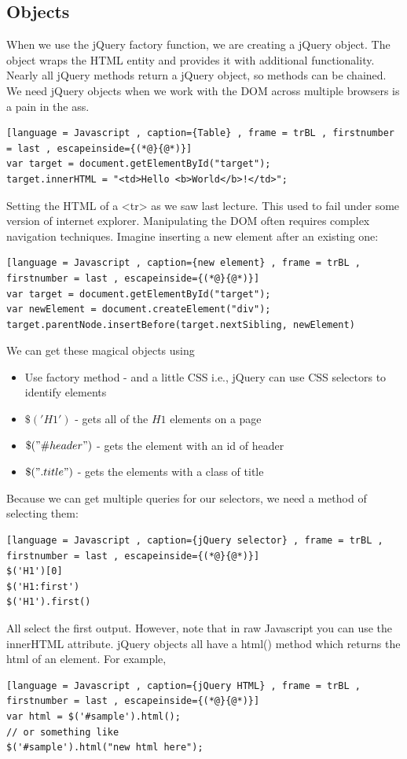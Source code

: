 \documentclass[a4paper]{article}
\theoremstyle{plain}
\theoremstyle{definition}
\theoremstyle{remark}
\begin{document}
\begin{flushleft}
\subsection{Objects}
When we use the jQuery factory function, we are creating a jQuery object. The object wraps the HTML entity and provides it with additional functionality. Nearly all jQuery methods return a jQuery object, so methods can be chained. We need jQuery objects when we work with the DOM across multiple browsers is a pain in the ass.
\begin{lstlisting}[language = Javascript , caption={Table} , frame = trBL , firstnumber = last , escapeinside={(*@}{@*)}]
var target = document.getElementById("target");
target.innerHTML = "<td>Hello <b>World</b>!</td>";
\end{lstlisting}
Setting the HTML of a <tr> as we saw last lecture. This used to fail under some version of internet explorer. Manipulating the DOM often requires complex navigation techniques. Imagine inserting a new element after an existing one:
\begin{lstlisting}[language = Javascript , caption={new element} , frame = trBL , firstnumber = last , escapeinside={(*@}{@*)}]
var target = document.getElementById("target");
var newElement = document.createElement("div");
target.parentNode.insertBefore(target.nextSibling, newElement)
\end{lstlisting}
We can get these magical objects using
\begin{itemize}
	\item Use factory method - and a little CSS i.e., jQuery can use CSS selectors to identify elements
	\item $\$('H1')$ - gets all of the $H1$ elements on a page
	\item $\$("\# header")$ - gets the element with an id of header
	\item $\$(".title")$ - gets the elements with a class of title
\end{itemize}
Because we can get multiple queries for our selectors, we need a method of selecting them:
\begin{lstlisting}[language = Javascript , caption={jQuery selector} , frame = trBL , firstnumber = last , escapeinside={(*@}{@*)}]
$('H1')[0]
$('H1:first')
$('H1').first()
\end{lstlisting}
All select the first output. However, note that in raw Javascript you can use the innerHTML attribute. jQuery objects all have a html() method which returns the html of an element. For example,
\begin{lstlisting}[language = Javascript , caption={jQuery HTML} , frame = trBL , firstnumber = last , escapeinside={(*@}{@*)}]
var html = $('#sample').html();
// or something like
$('#sample').html("new html here");
\end{lstlisting}

\end{flushleft}
\end{document}
